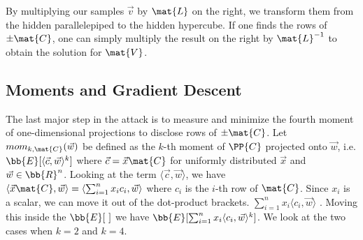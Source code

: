 By multiplying our samples $\vec{v}$ by $\mat{L}$ on the right, we transform them from the hidden parallelepiped to the hidden hypercube. If one finds
the rows of $\pm \mat{C}$, one can simply multiply the result on the right by $\mat{L}^{-1}$ to obtain the solution for $\mat{V}$.

\subsection{Moments and Gradient Descent}
The last major step in the attack is to measure and minimize the fourth moment of one-dimensional projections to disclose rows of $\pm \mat{C}$.
Let $mom_{k, \mat{C}}(\vec{w})$ be defined as the $k$-th moment of $\PP{C}$ projected onto $\vec{w}$, i.e. 
$\bb{E}[\langle \vec{c}, \vec{w} \rangle ^k]$ where $\vec{c} = \vec{x} \mat{C}$ for uniformly distributed $\vec{x}$ and $\vec{w} \in \bb{R}^n$.
Looking at the term $\langle \vec{c}, \vec{w} \rangle$, we have $\langle \vec{x} \mat{C}, \vec{w} \rangle = \langle \sum_{i=1}^{n} x_i c_i, \vec{w} \rangle$
where $c_i$ is the $i$-th row of $\mat{C}$. Since $x_i$ is a scalar, we can move it out of the dot-product brackets. $\sum_{i=1}^{n} x_i \langle c_i, \vec{w} \rangle $ .
Moving this inside the $\bb{E}[ \ ]$ we have $\bb{E}[\sum_{i=1}^{n} x_i \langle c_i, \vec{w} \rangle ^k ]$.
We look at the two cases when $k = 2$ and $k=4$.
